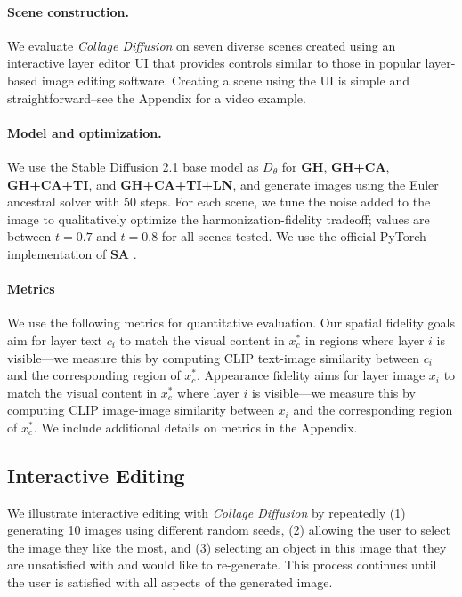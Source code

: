 \paragraph{Scene construction.}
We evaluate \textit{Collage Diffusion} on seven diverse scenes created using an interactive layer editor UI that provides controls similar to those in popular layer-based image editing software.
Creating a scene using the UI is simple and straightforward--see the Appendix for a video example.

\vspace{-0.5em}
\paragraph{Model and optimization.}
We use the Stable Diffusion \cite{latentDiffusion} 2.1 base model as $D_\theta$ for \textbf{GH}, \textbf{GH+CA}, \textbf{GH+CA+TI}, and \textbf{GH+CA+TI+LN}, and generate images using the Euler ancestral solver with 50 steps. 
For each scene, we tune the noise added to the image to qualitatively optimize the harmonization-fidelity tradeoff; values are between $t=0.7$ and $t=0.8$ for all scenes tested. 
We use the official PyTorch implementation of \textbf{SA} \cite{tumanyan2022plug}. 
\vspace{-0.5em}
\paragraph{Metrics} 
\vspace{-0.5em}
We use the following metrics for quantitative evaluation. Our spatial fidelity goals aim for layer text $c_i$ to match the visual content in $x^*_c$ in regions where layer $i$ is visible---we measure this by computing CLIP \cite{radford2021learning} text-image similarity between $c_i$ and the corresponding region of $x^*_c$. 
Appearance fidelity aims for layer image $x_i$ to match the visual content in $x^*_c$ where layer $i$ is visible---we measure this by computing CLIP image-image similarity between $x_i$ and the corresponding region of $x^*_c$. 
We include additional details on metrics in the Appendix.
\vspace{-0.5em}
\subsection{Interactive Editing} \label{exp:interactive}
\vspace{-0.5em}
We illustrate interactive editing with \textit{Collage Diffusion} by repeatedly (1) generating 10 images using different random seeds, (2) allowing the user to select the image they like the most, and (3) selecting an object in this image that they are unsatisfied with and would like to re-generate. This process continues until the user is satisfied with all aspects of the generated image. 

